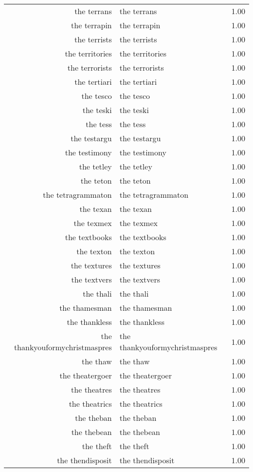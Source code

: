 \begin{table}[ht]
\begin{tabular}{rlr}
  the terrans & the terrans & 1.00 \\ 
  the terrapin & the terrapin & 1.00 \\ 
  the terrists & the terrists & 1.00 \\ 
  the territories & the territories & 1.00 \\ 
  the terrorists & the terrorists & 1.00 \\ 
  the tertiari & the tertiari & 1.00 \\ 
  the tesco & the tesco & 1.00 \\ 
  the teski & the teski & 1.00 \\ 
  the tess & the tess & 1.00 \\ 
  the testargu & the testargu & 1.00 \\ 
  the testimony & the testimony & 1.00 \\ 
  the tetley & the tetley & 1.00 \\ 
  the teton & the teton & 1.00 \\ 
  the tetragrammaton & the tetragrammaton & 1.00 \\ 
  the texan & the texan & 1.00 \\ 
  the texmex & the texmex & 1.00 \\ 
  the textbooks & the textbooks & 1.00 \\ 
  the texton & the texton & 1.00 \\ 
  the textures & the textures & 1.00 \\ 
  the textvers & the textvers & 1.00 \\ 
  the thali & the thali & 1.00 \\ 
  the thamesman & the thamesman & 1.00 \\ 
  the thankless & the thankless & 1.00 \\ 
  the thankyouformychristmaspres & the thankyouformychristmaspres & 1.00 \\ 
  the thaw & the thaw & 1.00 \\ 
  the theatergoer & the theatergoer & 1.00 \\ 
  the theatres & the theatres & 1.00 \\ 
  the theatrics & the theatrics & 1.00 \\ 
  the theban & the theban & 1.00 \\ 
  the thebean & the thebean & 1.00 \\ 
  the theft & the theft & 1.00 \\ 
  the thendisposit & the thendisposit & 1.00 \\ 

\end{tabular}
\end{table}
